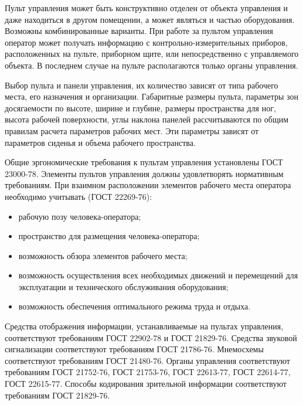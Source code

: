         Пульт управления может быть конструктивно отделен от объекта управления
        и даже находиться в другом помещении, а может являться и частью
        оборудования. Возможны комбинированные варианты. При работе за пультом
        управления оператор может получать информацию с
        контрольно-измерительных приборов, расположенных на пульте, приборном
        щите, или непосредственно с управляемого объекта. В последнем случае на
        пульте располагаются только органы управления. 

        Выбор пульта и панели управления, их количество зависят от типа
        рабочего места, его назначения и организации. Габаритные размеры
        пульта, параметры зон досягаемости по высоте, ширине и глубине, размеры
        пространства для ног, высота рабочей поверхности, углы наклона панелей
        рассчитываются по общим правилам расчета параметров рабочих мест. Эти
        параметры зависят от параметров сиденья и объема рабочего пространства.

        Общие эргономические требования к пультам управления установлены ГОСТ
        23000-78. Элементы пультов управления должны удовлетворять нормативным
        требованиям. При взаимном расположении элементов рабочего места
        оператора необходимо учитывать (ГОСТ 22269-76):
        \begin{itemize}
            \item рабочую позу человека-оператора;
            \item пространство для размещения человека-оператора;
            \item возможность обзора элементов рабочего места;
            \item возможность осуществления всех необходимых движений
                и перемещений для эксплуатации и технического обслуживания
                оборудования;
            \item возможность обеспечения оптимального режима труда и отдыха.
        \end{itemize}

        Средства отображения информации, устанавливаемые на пультах управления,
        соответствуют требованиям ГОСТ 22902-78 и ГОСТ 21829-76. Средства звуковой
        сигнализации соответствуют требованиям ГОСТ 21786-76. Мнемосхемы
        соответствуют требованиям ГОСТ 21480-76. Органы управления соответствуют
        требованиям ГОСТ 21752-76, ГОСТ 21753-76, ГОСТ 22613-77, ГОСТ 22614-77,
        ГОСТ 22615-77. Способы кодирования зрительной информации соответствуют
        требованиям ГОСТ 21829-76.


